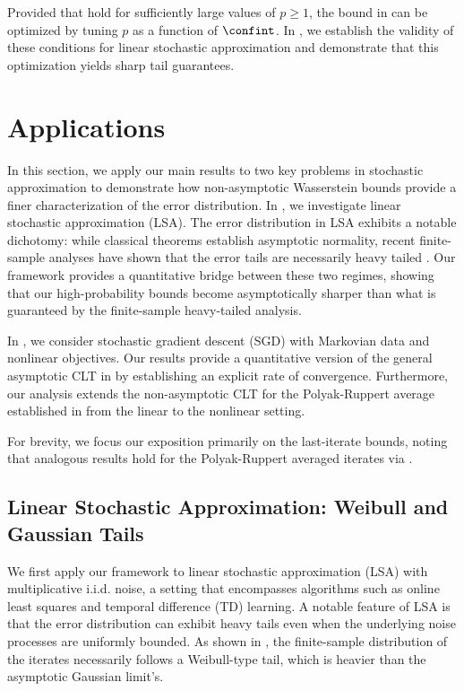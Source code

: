 \documentclass[11pt]{article}
\begin{document}
Provided that  hold for sufficiently large values of $p \geq 1$, the bound in  can be optimized by tuning $p$ as a function of $\confint$. 
In , we establish the validity of these conditions for linear stochastic approximation and demonstrate that this optimization yields sharp tail guarantees. 









\section{Applications}\label{sec:applications}

In this section, we apply our main results to two key problems in stochastic approximation to demonstrate how non-asymptotic Wasserstein bounds provide a finer characterization of the error distribution.
In , we investigate linear stochastic approximation (LSA). 
The error distribution in LSA exhibits a notable dichotomy: while classical theorems establish asymptotic normality, recent finite-sample analyses have shown that the error tails are necessarily heavy tailed \citep{chen_contractive_concentration}. 
Our framework provides a quantitative bridge between these two regimes, showing that our high-probability bounds become asymptotically sharper than what is guaranteed by the finite-sample heavy-tailed analysis.


In , we consider stochastic gradient descent (SGD) with Markovian data and nonlinear objectives. 
Our results provide a quantitative version of the general asymptotic CLT in \citep{borkar25} by establishing an explicit rate of convergence. 
Furthermore, our analysis extends the non-asymptotic CLT for the Polyak-Ruppert average established in \citep{srikant2024CLT} from the linear to the nonlinear setting.



For brevity, we focus our exposition primarily on the last-iterate bounds, noting that analogous results hold for the Polyak-Ruppert averaged iterates via .





\subsection{Linear Stochastic Approximation: Weibull and Gaussian Tails}\label{sec:lsa}
We first apply our framework to linear stochastic approximation (LSA) with multiplicative i.i.d. noise, a setting that encompasses algorithms such as online least squares and temporal difference (TD) learning. 
A notable feature of LSA is that the error distribution can exhibit heavy tails even when the underlying noise processes are uniformly bounded. 
As shown in \citep{chen_contractive_concentration}, the finite-sample distribution of the iterates necessarily follows a Weibull-type tail, which is heavier than the asymptotic Gaussian limit's. 
\end{document}
